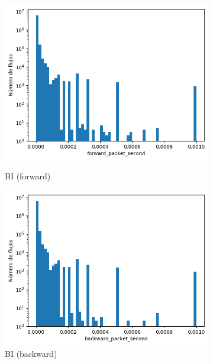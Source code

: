 \begin{figure}[H]
\begin{subfigure}[b]{0.26\textwidth}
        \includegraphics[width=\textwidth]{media/packet_pincer_botiot/forward_packet_second_linear_x_log_y.png}
        \caption{BI (forward)}
        \includegraphics[width=\textwidth]{media/packet_pincer_botiot/backward_packet_second_linear_x_log_y.png}
        \caption{BI (backward)}
    \end{subfigure}
    \hfill
    \begin{subfigure}[b]{0.26\textwidth}
        \centering

\end{subfigure}
\end{figure}
